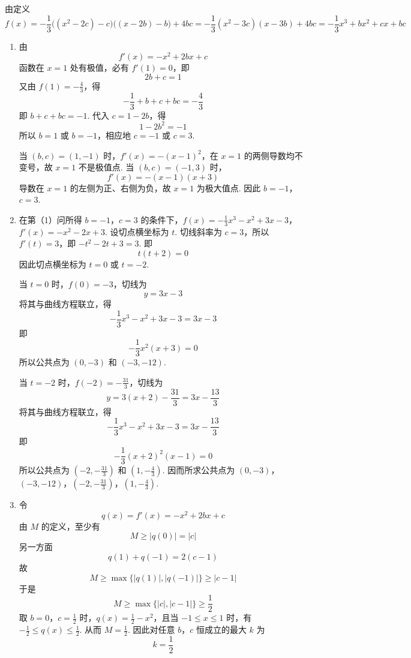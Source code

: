 \begin{solution}
由定义
\[
f(x)=-\frac13\bigl((x^{2}-2c)-c\bigr)\bigl((x-2b)-b\bigr)+4bc
=-\frac13(x^{2}-3c)(x-3b)+4bc
=-\frac13x^{3}+bx^{2}+cx+bc
\]

\begin{enumerate}
\item 由
\[
f'(x)=-x^{2}+2bx+c
\]
函数在 \(x=1\) 处有极值，必有 \(f'(1)=0\)，即
\[
2b+c=1
\]
又由 \(f(1)=-\frac43\)，得
\[
-\frac13+b+c+bc=-\frac43
\]
即 \(b+c+bc=-1\). 代入 \(c=1-2b\)，得
\[
1-2b^{2}=-1
\]
所以 \(b=1\) 或 \(b=-1\)，相应地 \(c=-1\) 或 \(c=3\).

当 \((b,c)=(1,-1)\) 时，\(f'(x)=-(x-1)^{2}\)，在 \(x=1\) 的两侧导数均不变号，故 \(x=1\) 不是极值点. 当 \((b,c)=(-1,3)\) 时，
\[
f'(x)=-(x-1)(x+3)
\]
导数在 \(x=1\) 的左侧为正、右侧为负，故 \(x=1\) 为极大值点. 因此 \(b=-1\)，\(c=3\).

\item 在第（1）问所得 \(b=-1\)，\(c=3\) 的条件下，\(f(x)=-\frac13x^{3}-x^{2}+3x-3\)，\(f'(x)=-x^{2}-2x+3\). 设切点横坐标为 \(t\). 切线斜率为 \(c=3\)，所以 \(f'(t)=3\)，即 \(-t^{2}-2t+3=3\).
即
\[
t(t+2)=0
\]
因此切点横坐标为 \(t=0\) 或 \(t=-2\).

当 \(t=0\) 时，\(f(0)=-3\)，切线为
\[
y=3x-3
\]
将其与曲线方程联立，得
\[
-\frac13x^{3}-x^{2}+3x-3=3x-3
\]
即
\[
-\frac13x^{2}(x+3)=0
\]
所以公共点为 \((0,-3)\) 和 \((-3,-12)\).

当 \(t=-2\) 时，\(f(-2)=-\frac{31}{3}\)，切线为
\[
y=3(x+2)-\frac{31}{3}=3x-\frac{13}{3}
\]
将其与曲线方程联立，得
\[
-\frac13x^{3}-x^{2}+3x-3=3x-\frac{13}{3}
\]
即
\[
-\frac13(x+2)^{2}(x-1)=0
\]
所以公共点为 \(\left(-2,-\frac{31}{3}\right)\) 和 \(\left(1,-\frac43\right)\). 因而所求公共点为 \((0,-3)\)，\((-3,-12)\)，\(\left(-2,-\frac{31}{3}\right)\)，\(\left(1,-\frac43\right)\).

\item 令
\[
q(x)=f'(x)=-x^{2}+2bx+c
\]
由 \(M\) 的定义，至少有
\[
M\geqslant |q(0)|=|c|
\]
另一方面
\[
q(1)+q(-1)=2(c-1)
\]
故
\[
M\geqslant\max\{|q(1)|,|q(-1)|\}\geqslant |c-1|
\]
于是
\[
M\geqslant\max\{|c|,|c-1|\}\geqslant\frac12
\]
取 \(b=0\)，\(c=\frac12\) 时，\(q(x)=\frac12-x^{2}\)，且当 \(-1\leqslant x\leqslant1\) 时，有 \(-\frac12\leqslant q(x)\leqslant\frac12\).
从而 \(M=\frac12\). 因此对任意 \(b\)，\(c\) 恒成立的最大 \(k\) 为
\[
k=\frac12
\]
\end{enumerate}
\end{solution}
